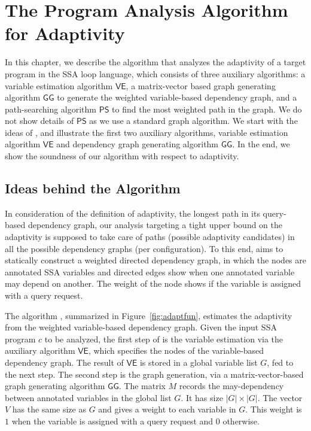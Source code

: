 \chapter{The Program Analysis Algorithm for Adaptivity}
\label{ch:adapt-algo}

In this chapter, we describe the algorithm {\ADAPTSYSTEM} that analyzes the adaptivity of a target program in the SSA loop language, which consists of three auxiliary algorithms: a variable estimation algorithm $\mathsf{VE}$, a matrix-vector based graph generating algorithm $\mathsf{GG}$ to generate the weighted variable-based dependency graph, and a path-searching algorithm $\mathsf{PS}$ to find the most weighted path in the graph. We do not show details of $\mathsf{PS}$ as we use a standard graph algorithm.
We start with the ideas of {\ADAPTSYSTEM}, and illustrate the first two auxiliary algorithms, variable estimation algorithm $\mathsf{VE}$ and dependency graph generating algorithm $\mathsf{GG}$. 
In the end, we show the soundness of our algorithm with respect to adaptivity.  


\section{Ideas behind the Algorithm}
\label{sec:adapt-algo-ideas}
In consideration of the definition of adaptivity, the longest path in its query-based dependency graph, our analysis targeting a tight upper bound on the
adaptivity is supposed to take care of paths (possible adaptivity candidates) in all the possible dependency graphs (per configuration).
To this end, {\ADAPTSYSTEM} aims to statically construct a weighted directed dependency graph, in which the nodes are annotated SSA variables and directed edges show when one annotated variable may depend on another. The weight of the node shows if the variable is assigned with a query request. 

The algorithm {\ADAPTSYSTEM}, summarized in Figure~\ref{fig:adaptfun}, estimates the adaptivity from the weighted variable-based dependency graph. Given the input SSA program $c$ to be analyzed, the first step of {\ADAPTSYSTEM} is the variable estimation via the auxiliary algorithm $\mathsf{VE}$, which specifies the nodes of the variable-based dependency graph. The result of $\mathsf{VE}$ is stored in a global variable list $G$, fed to the next step. The second step is the graph generation, via a matrix-vector-based graph generating algorithm $\mathsf{GG}$. The matrix $M$ records the may-dependency between annotated variables in the global list $G$. It has size $|G| \times |G|$. The vector $V$ has the same size as $G$ and gives a weight to each variable in $G$. This weight is $1$ when the variable is assigned with a query request and $0$ otherwise. 

